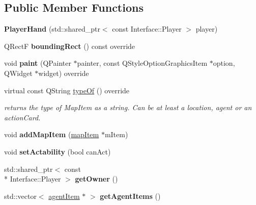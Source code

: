 \subsection*{Public Member Functions}
\begin{DoxyCompactItemize}
\item 
\hypertarget{class_player_hand_a1e9c7e7f016a848e2cc6e7c7ec4e5f15}{{\bfseries Player\-Hand} (std\-::shared\-\_\-ptr$<$ const Interface\-::\-Player $>$ player)}\label{class_player_hand_a1e9c7e7f016a848e2cc6e7c7ec4e5f15}

\item 
\hypertarget{class_player_hand_a21ecf33831fd13b0e133d9a7a79ef556}{Q\-Rect\-F {\bfseries bounding\-Rect} () const override}\label{class_player_hand_a21ecf33831fd13b0e133d9a7a79ef556}

\item 
\hypertarget{class_player_hand_aab157c0dbab0b0c17bde904a2a2ee55e}{void {\bfseries paint} (Q\-Painter $\ast$painter, const Q\-Style\-Option\-Graphics\-Item $\ast$option, Q\-Widget $\ast$widget) override}\label{class_player_hand_aab157c0dbab0b0c17bde904a2a2ee55e}

\item 
virtual const Q\-String \hyperlink{class_player_hand_afc80409390272a9f5c44899b015e69d0}{type\-Of} () override
\begin{DoxyCompactList}\small\item\em returns the type of Map\-Item as a string. Can be at least a location, agent or an action\-Card. \end{DoxyCompactList}\item 
\hypertarget{class_player_hand_a870059bc3b346c04d5fadffce5c79af1}{void {\bfseries add\-Map\-Item} (\hyperlink{classmap_item}{map\-Item} $\ast$m\-Item)}\label{class_player_hand_a870059bc3b346c04d5fadffce5c79af1}

\item 
\hypertarget{class_player_hand_a1c0c4db8433ff1c0b9ed4566b1ae7600}{void {\bfseries set\-Actability} (bool can\-Act)}\label{class_player_hand_a1c0c4db8433ff1c0b9ed4566b1ae7600}

\item 
\hypertarget{class_player_hand_a27dd9d428f7b3b2c89017d1947a07006}{std\-::shared\-\_\-ptr$<$ const \\*
Interface\-::\-Player $>$ {\bfseries get\-Owner} ()}\label{class_player_hand_a27dd9d428f7b3b2c89017d1947a07006}

\item 
\hypertarget{class_player_hand_abe3ca6df372931db501726da3a482efd}{std\-::vector$<$ \hyperlink{classagent_item}{agent\-Item} $\ast$ $>$ {\bfseries get\-Agent\-Items} ()}\label{class_player_hand_abe3ca6df372931db501726da3a482efd}


\end{DoxyCompactItemize}
